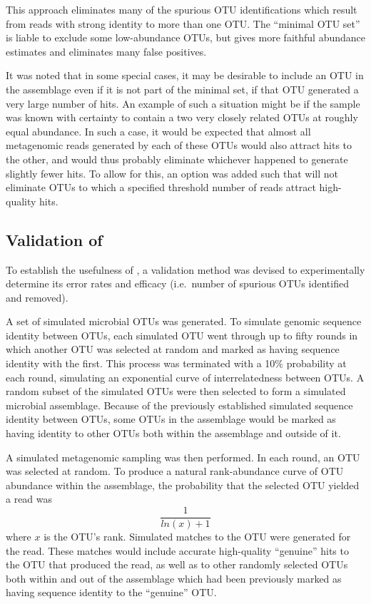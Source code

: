 This approach eliminates many of the spurious \ac{OTU} identifications which result from reads with strong identity to more than one \ac{OTU}.
The ``minimal \ac{OTU} set'' is liable to exclude some low-abundance \acp{OTU}, but gives more faithful abundance estimates and eliminates many false positives.

It was noted that in some special cases, it may be desirable to include an \ac{OTU} in the assemblage even if it is not part of the minimal set, if that \ac{OTU} generated a very large number of  hits.
An example of such a situation might be if the sample was known with certainty to contain a two very closely related \acp{OTU} at roughly equal abundance.
In such a case, it would be expected that almost all metagenomic reads generated by each of these \acp{OTU} would also attract  hits to the other, and  would thus probably eliminate whichever happened to generate slightly fewer hits.
To allow for this, an option was added such that  will not eliminate \acp{OTU} to which a specified threshold number of reads attract high-quality hits.

\subsection{Validation of }

To establish the usefulness of , a validation method was devised to experimentally determine its error rates and efficacy (i.e.\ number of spurious \acp{OTU} identified and removed).

A set of simulated microbial \acp{OTU} was generated.
To simulate genomic sequence identity between \acp{OTU}, each simulated \ac{OTU} went through up to fifty rounds in which another \ac{OTU} was selected at random and marked as having sequence identity with the first.
This process was terminated with a 10\% probability at each round, simulating an exponential curve of interrelatedness between \acp{OTU}.
A random subset of the simulated \acp{OTU} were then selected to form a simulated microbial assemblage.
Because of the previously established simulated sequence identity between \acp{OTU}, some \acp{OTU} in the assemblage would be marked as having identity to other \acp{OTU} both within the assemblage and outside of it.

A simulated metagenomic sampling was then performed.
In each round, an \ac{OTU} was selected at random.
To produce a natural rank-abundance curve of \ac{OTU} abundance within the assemblage, the probability that the selected \ac{OTU} yielded a read was
\begin{equation*}
\frac{1}{ln(x)+1}
\end{equation*}
where $x$ is the \ac{OTU}'s rank.
Simulated  matches to the \ac{OTU} were generated for the read.
These matches would include accurate high-quality ``genuine'' hits to the \ac{OTU} that produced the read, as well as to other randomly selected \acp{OTU} both within and out of the assemblage which had been previously marked as having sequence identity to the ``genuine'' \ac{OTU}.

